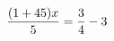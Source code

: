 \documentclass[preview]{standalone}
\begin{document}
\begin{align*}
\special{dvisvgm:raw <g id='unique000'>}\frac{(1 + 45) x}{5} = \frac{3}{4} - 3\special{dvisvgm:raw </g>}
\end{align*}
\end{document}
